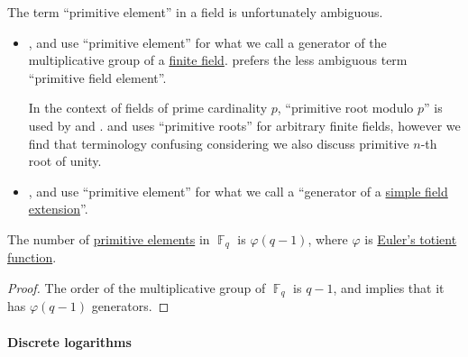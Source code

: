 \begin{remark}\label{rem:primitive_element_terminology}
  The term \enquote{primitive element} in a field is unfortunately ambiguous.

  \begin{itemize}
    \item {},  and  use \enquote{primitive element} for what we call a generator of the multiplicative group of a \hyperref[def:finite_field]{finite field}.  prefers the less ambiguous term \enquote{primitive field element}.

    In the context of fields of prime cardinality \( p \), \enquote{primitive root modulo \( p \)} is used by  and .  and  uses \enquote{primitive roots} for arbitrary finite fields, however we find that terminology confusing considering we also discuss primitive \( n \)-th root of unity.

    \item {},  and  use \enquote{primitive element} for what we call a \enquote{generator of a \hyperref[def:simple_extension]{simple field extension}}.
  \end{itemize}
\end{remark}

\begin{proposition}\label{thm:primitive_element_cardinality}
  The number of \hyperref[def:finite_field_primitive_element]{primitive elements} in \( \BbbF_q \) is \( \varphi(q - 1) \), where \( \varphi \) is \hyperref[def:eulers_totient_function]{Euler's totient function}.
\end{proposition}
\begin{proof}
  The order of the multiplicative group of \( \BbbF_q \) is \( q - 1 \), and  implies that it has \( \varphi(q - 1) \) generators.
\end{proof}

\paragraph{Discrete logarithms}

